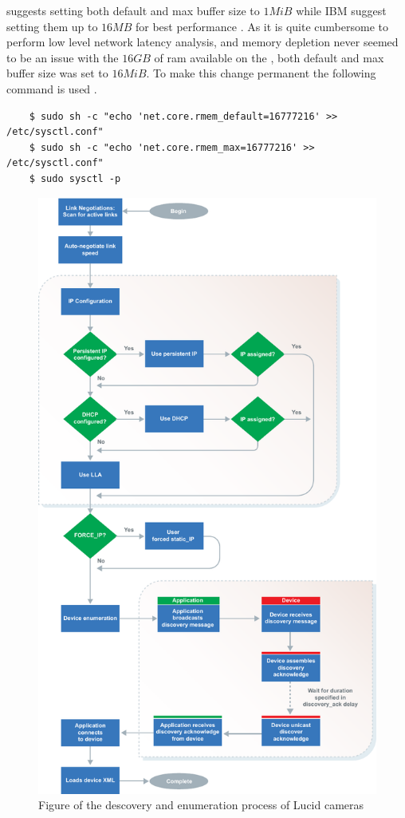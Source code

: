\lucid suggests setting both default and max buffer size to $1MiB$ while IBM suggest setting them up to $16MB$ for best performance \cite{lucidvisionlabsReceiveBuffers2020}\cite{ibmIBMDocumentationTCPIP2021}.
As it is quite cumbersome to perform low level network latency analysis, and memory depletion never seemed to be an issue with the $16GB$ of \gls{ram} available on the \jx, both default and max buffer size was set to $16MiB$.
To make this change permanent the following command is used \cite{redhat10ChangingNetwork}.
\begin{verbatim}
    $ sudo sh -c "echo 'net.core.rmem_default=16777216' >> /etc/sysctl.conf"
    $ sudo sh -c "echo 'net.core.rmem_max=16777216' >> /etc/sysctl.conf"
    $ sudo sysctl -p
\end{verbatim}







\begin{figure}
    \centering
    \includegraphics[height=\textheight]{figures/lucid_ip_discovery.pdf}
    \caption{Figure of the descovery and enumeration process of Lucid cameras \cite{TritonMPPolarized2020}}
    \label{fig:lucid_ip_discovery}
\end{figure}